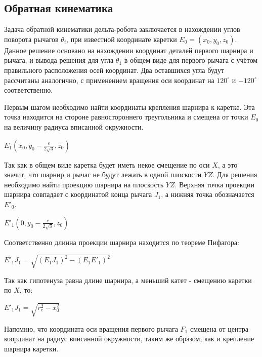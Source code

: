 \subsection{Обратная кинематика}

Задача обратной кинематики дельта-робота заключается в нахождении углов поворота рычагов $\theta_{i}$, при известной координате каретки $E_{0}=(x_{0},y_{0},z_{0})$. Данное решение основано на нахождении координат деталей первого шарнира и рычага, и вывода решения для угла $\theta_{1}$ в общем виде для первого рычага с учётом правильного расположения осей координат. Два оставшихся угла будут рассчитаны аналогично, с применением вращения оси координат на $120^{\circ}$ и $-120^{\circ}$ соответственно.

Первым шагом необходимо найти координаты крепления шарнира к каретке. Эта точка находится на стороне равностороннего треугольника и смещена от точки $E_{0}$ на величину радиуса вписанной окружности.

\begin{center}
$E_{1} (x_{0},y_{0}-\frac{e}{2\sqrt{3}},z_{0})$
\end{center}

Так как в общем виде каретка будет иметь некое смещение по оси $X$, а это значит, что шарнир и рычаг не будут лежать в одной плоскости $YZ$. Для решения необходимо найти проекцию шарнира на плоскость $YZ$. Верхняя точка проекции шарнира совпадает с координатой конца рычага $J_{1}$, а нижняя точка обозначается $E'_{0}$. 

\begin{center}
$E'_{1} (0,y_{0}-\frac{e}{2\sqrt{3}},z_{0})$
\end{center}

Соответственно длинна проекции шарнира находится по теореме Пифагора:

\begin{center}
$E'_{1}J_{1} = \sqrt{(E_{1}J_{1})^{2} -(E_{1}E'_{1})^{2}}  $
\end{center}

Так как гипотенуза равна длине шарнира, а меньший катет - смещению каретки по $X$, то: 

\begin{center}
    $E'_{1}J_{1} = \sqrt{r^{2}_{e} - x^{2}_{0} }  $
\end{center}

Напомню, что координата оси вращения первого рычага $F_{1}$  смещена от центра координат на радиус вписанной окружности, таким же образом, как и крепление шарнира каретки.

